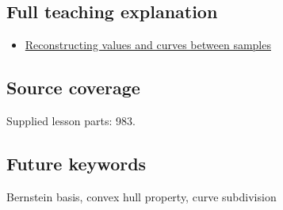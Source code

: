 \subsection{Full teaching explanation}\label{appendix-ddbec701898c-full-teaching-explanation}

\begin{itemize}
\tightlist
\item
  \hyperref[02-foundations-ii-ch028-reconstructing-values-and-curves-between-samples]{Reconstructing values and curves between samples}
\end{itemize}

\subsection{Source coverage}\label{appendix-ddbec701898c-source-coverage}

Supplied lesson parts: 983.

\subsection{Future keywords}\label{appendix-ddbec701898c-future-keywords}

Bernstein basis, convex hull property, curve subdivision
